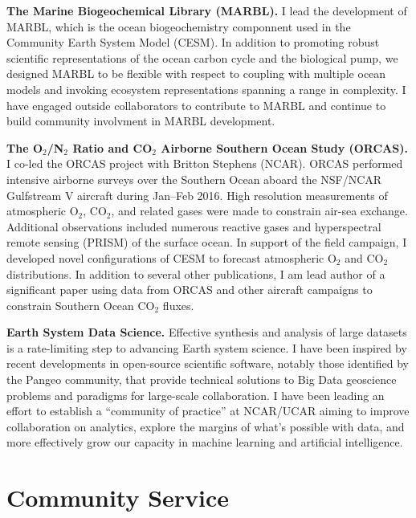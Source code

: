 \documentclass[11pt]{article}
\begin{document}
\begin{description}[style=multiline,leftmargin=0.5cm,font=\normalfont]
\item \textbf{The Marine Biogeochemical Library (MARBL).}
I lead the development of MARBL, which is the ocean biogeochemistry componnent used in the Community Earth System Model (CESM).
In addition to promoting robust scientific representations of the ocean carbon cycle and the biological pump, we designed MARBL to be flexible with respect to coupling with multiple ocean models and invoking ecosystem representations spanning a range in complexity.
I have engaged outside collaborators to contribute to MARBL and continue to build community involvment in MARBL development.

\item \textbf{The O$_2$/N$_2$ Ratio and CO$_2$ Airborne Southern Ocean Study (ORCAS).} I co-led the ORCAS project with Britton Stephens (NCAR).
ORCAS performed intensive airborne surveys over the Southern Ocean aboard the NSF/NCAR Gulfstream V aircraft during Jan--Feb 2016.
High resolution measurements of atmospheric O$_2$, CO$_2$, and related gases were made to constrain air-sea exchange.
Additional observations included numerous reactive gases and hyperspectral remote sensing (PRISM) of the surface ocean.
In support of the field campaign, I developed novel configurations of CESM to forecast atmospheric O$_2$ and CO$_2$ distributions.
In addition to several other publications, I am lead author of a significant paper using data from ORCAS and other aircraft campaigns to constrain Southern Ocean CO$_2$ fluxes.

\item \textbf{Earth System Data Science.} Effective synthesis and analysis of large datasets is a rate-limiting step to advancing Earth system science.
I have been inspired by recent developments in open-source scientific software, notably those identified by the Pangeo community, that provide technical solutions to Big Data geoscience problems and paradigms for large-scale collaboration.
I have been leading an effort to establish a “community of practice” at NCAR/UCAR aiming to improve collaboration on analytics, explore the margins of what’s possible with data, and more effectively grow our capacity in machine learning and artificial intelligence.


\end{description}


\section{Community Service}
\end{document}
